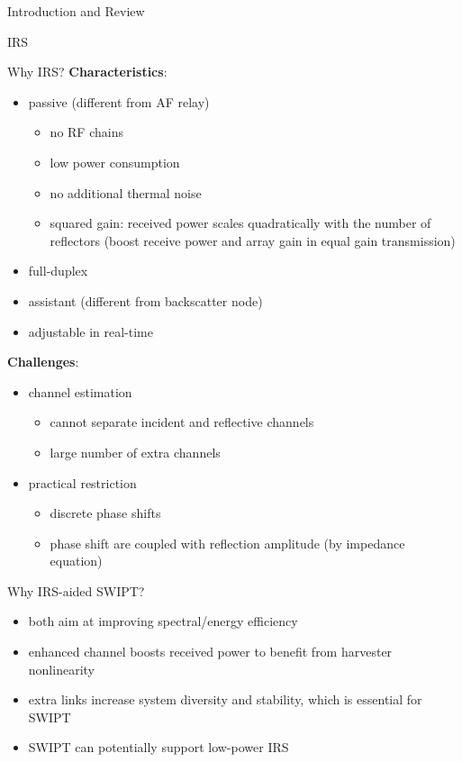 \documentclass[9pt]{beamer}
\begin{document}
\begin{section}{Introduction and Review}
\begin{subsection}{IRS}
		\begin{frame}{Why IRS?}
			\textbf{Characteristics}:
			\begin{itemize}
				\item passive (different from AF relay)
				\begin{itemize}
					\item no RF chains
					\item low power consumption
					\item no additional thermal noise
					\item \alert{squared gain}: received power scales quadratically with the number of reflectors (boost receive power and array gain in equal gain transmission)
				\end{itemize}
				\item full-duplex
				\item assistant (different from backscatter node)
				\item adjustable in real-time
			\end{itemize}
			\vspace{1em}
			\textbf{Challenges}:
			\begin{itemize}
				\item channel estimation
				\begin{itemize}
					\item cannot separate incident and reflective channels
					\item large number of extra channels
				\end{itemize}
				\item practical restriction
				\begin{itemize}
					\item discrete phase shifts
					\item phase shift are coupled with reflection amplitude (by impedance equation)
				\end{itemize}
			\end{itemize}
		\end{frame}

		\begin{frame}{Why IRS-aided SWIPT?}
			\begin{itemize}
				\item both aim at improving spectral/energy efficiency
				\item enhanced channel boosts received power to benefit from harvester nonlinearity
				\item extra links increase system diversity and stability, which is essential for SWIPT
				\item SWIPT can potentially support low-power IRS
			\end{itemize}
		\end{frame}
	\end{subsection}
\end{section}



\end{document}
